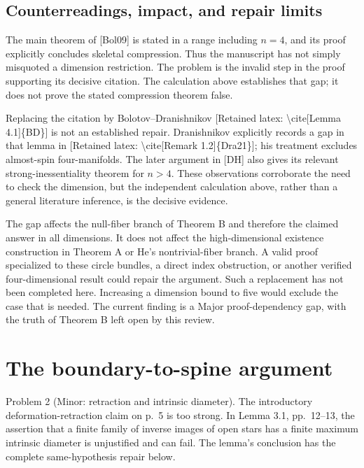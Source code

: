 \documentclass[10pt]{article}
\begin{document}
\subsection*{Counterreadings, impact, and repair limits}
The main theorem of [Bol09] is stated in a range including \(n=4\), and its proof explicitly concludes skeletal compression. Thus the manuscript has not simply misquoted a dimension restriction. The problem is the invalid step in the proof supporting its decisive citation. The calculation above establishes that gap; it does not prove the stated compression theorem false.\par
Replacing the citation by Bolotov–Dranishnikov [Retained latex: \textbackslash{}cite[Lemma 4.1]\{BD\}] is not an established repair. Dranishnikov explicitly records a gap in that lemma in [Retained latex: \textbackslash{}cite[Remark 1.2]\{Dra21\}]; his treatment excludes almost-spin four-manifolds. The later argument in [DH] also gives its relevant strong-inessentiality theorem for \(n>4\). These observations corroborate the need to check the dimension, but the independent calculation above, rather than a general literature inference, is the decisive evidence.\par
The gap affects the null-fiber branch of Theorem B and therefore the claimed answer in all dimensions. It does not affect the high-dimensional existence construction in Theorem A or He’s nontrivial-fiber branch. A valid proof specialized to these circle bundles, a direct index obstruction, or another verified four-dimensional result could repair the argument. Such a replacement has not been completed here. Increasing a dimension bound to five would exclude the case that is needed. The current finding is a Major proof-dependency gap, with the truth of Theorem B left open by this review.\par
\section*{The boundary-to-spine argument}
Problem 2 (Minor: retraction and intrinsic diameter).  The introductory deformation-retraction claim on p. 5 is too strong. In Lemma 3.1, pp. 12–13, the assertion that a finite family of inverse images of open stars has a finite maximum intrinsic diameter is unjustified and can fail. The lemma’s conclusion has the complete same-hypothesis repair below.\par
\end{document}

